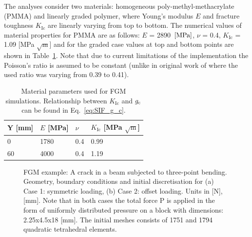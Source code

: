 \documentclass[onecolumn]{svjour3}
\begin{document}
The analyses consider two materials: homogeneous poly-methyl-methacrylate (PMMA) and linearly graded polymer, where Young's modulus $E$ and fracture toughness $K_\mathrm{Ic}$ are linearly varying from top to bottom. The numerical values of material properties for PMMA are as follows: $E$ = 2890~${\rm {[MPa]}}$, $\nu$ = 0.4,  $K_\mathrm{Ic}$ = 1.09 [MPa $\sqrt{\mathrm m}$] and for the graded case values at top and bottom points are shown in Table~\ref{tab:parameters_fgm}. Note that due to current limitations of the implementation the Poisson's ratio is assumed to be constant (unlike in original work of \cite{kim2004simulation} where the used ratio was varying from 0.39 to 0.41). 
% 
\begin{table}[h]
	\centering
	\begin{tabular}{llll}
		\hline
		Y [mm]            \hspace{1.0cm} 	&  $E$ [MPa] \hspace{1.0cm} & $\nu$    \hspace{1.0cm}     & $K_\mathrm{Ic}$ [MPa $\sqrt{\mathrm m}$]  \\ \hline
		$0  $              \hspace{1.0cm}   &  1780  	 \hspace{1.0cm}	& 0.4      \hspace{1.0cm}  		&  0.99\\
		$60  $            \hspace{1.0cm}   &  4000  	 \hspace{1.0cm}	& 0.4      \hspace{1.0cm}     &  1.19 \\
		\hline
	\end{tabular} 
	\caption{Material parameters used for FGM simulations. Relationship between $K_\mathrm{Ic}$ and $g_{\rm c}$ can be found in Eq.~\ref{eq:SIF_g_c}.}
	\label{tab:parameters_fgm}
\end{table}
% 
% 
% 
\begin{figure}[h!]
	\centering
	\begin{center}
	\def\svgwidth{12cm} 
	\caption{FGM example: A crack in a beam subjected to three-point bending. Geometry, boundary conditions and initial discretisation for (a) Case 1: symmetric loading, (b) Case 2: offset loading. Units in [N], [mm]. Note that in both cases the total force P is applied in the form of uniformly distributed pressure on a block with dimensions: 2.25x4.5x18 [mm]. The initial meshes consists of 1751 and 1794 quadratic tetrahedral elements.}
	\label{fig:fgm_mesh_load}
	\end{center}
\end{figure}
% 
\end{document}

